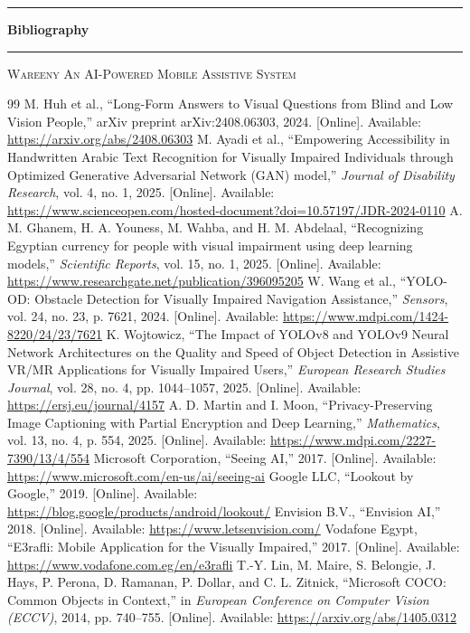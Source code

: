 \documentclass[a4paper]{report}
\newcommand{\frontcover}[1]{%
  \clearpage
  \thispagestyle{empty}
  \begin{center}
  \vspace*{\fill}
    {\color{coveraccent}\rule{0.18\textwidth}{3pt}}\par
    \vspace{0.6cm}
    {\fontsize{34}{38}\selectfont\bfseries\color{coverink} #1\par}
    \vspace{0.7cm}
    {\color{coverink!40}\rule{0.55\textwidth}{0.6pt}}\par
  \vspace*{\fill}
    {\footnotesize\scshape\color{coverink!55} Wareeny \quad\textbullet\quad An AI-Powered Mobile Assistive System\par}
    \vspace{0.6cm}
  \end{center}
  \clearpage
}
\begin{document}
\frontcover{Bibliography}
\begin{thebibliography}{99}
   M. Huh et al., ``Long-Form Answers to Visual Questions from Blind and Low Vision People,'' arXiv preprint arXiv:2408.06303, 2024. [Online]. Available: \url{https://arxiv.org/abs/2408.06303}
   M. Ayadi et al., ``Empowering Accessibility in Handwritten Arabic Text Recognition for Visually Impaired Individuals through Optimized Generative Adversarial Network (GAN) model,'' \textit{Journal of Disability Research}, vol. 4, no. 1, 2025. [Online]. Available: \url{https://www.scienceopen.com/hosted-document?doi=10.57197/JDR-2024-0110}
   A. M. Ghanem, H. A. Youness, M. Wahba, and H. M. Abdelaal, ``Recognizing Egyptian currency for people with visual impairment using deep learning models,'' \textit{Scientific Reports}, vol. 15, no. 1, 2025. [Online]. Available: \url{https://www.researchgate.net/publication/396095205}
   W. Wang et al., ``YOLO-OD: Obstacle Detection for Visually Impaired Navigation Assistance,'' \textit{Sensors}, vol. 24, no. 23, p. 7621, 2024. [Online]. Available: \url{https://www.mdpi.com/1424-8220/24/23/7621}
   K. Wojtowicz, ``The Impact of YOLOv8 and YOLOv9 Neural Network Architectures on the Quality and Speed of Object Detection in Assistive VR/MR Applications for Visually Impaired Users,'' \textit{European Research Studies Journal}, vol. 28, no. 4, pp. 1044--1057, 2025. [Online]. Available: \url{https://ersj.eu/journal/4157}
   A. D. Martin and I. Moon, ``Privacy-Preserving Image Captioning with Partial Encryption and Deep Learning,'' \textit{Mathematics}, vol. 13, no. 4, p. 554, 2025. [Online]. Available: \url{https://www.mdpi.com/2227-7390/13/4/554}
   Microsoft Corporation, ``Seeing AI,'' 2017. [Online]. Available: \url{https://www.microsoft.com/en-us/ai/seeing-ai}
   Google LLC, ``Lookout by Google,'' 2019. [Online]. Available: \url{https://blog.google/products/android/lookout/}
   Envision B.V., ``Envision AI,'' 2018. [Online]. Available: \url{https://www.letsenvision.com/}
   Vodafone Egypt, ``E3rafli: Mobile Application for the Visually Impaired,'' 2017. [Online]. Available: \url{https://www.vodafone.com.eg/en/e3rafli}
   T.-Y. Lin, M. Maire, S. Belongie, J. Hays, P. Perona, D. Ramanan, P. Dollar, and C. L. Zitnick, ``Microsoft COCO: Common Objects in Context,'' in \textit{European Conference on Computer Vision (ECCV)}, 2014, pp. 740--755. [Online]. Available: \url{https://arxiv.org/abs/1405.0312}

\end{thebibliography}
\end{document}
